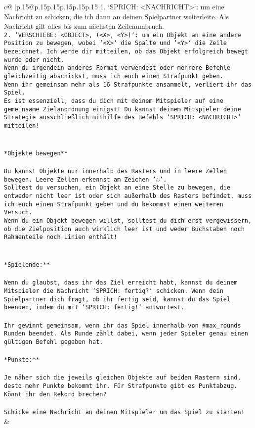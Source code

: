 \documentclass{article}
\begin{document}
{\begin{supertabular}{c@{$\;$}|p{.15\linewidth}@{}p{.15\linewidth}p{.15\linewidth}p{.15\linewidth}p{.15\linewidth}p{.15\linewidth}}
{{{1. `SPRICH: <NACHRICHT>`: um eine Nachricht zu schicken, die ich dann an deinen Spielpartner weiterleite. Als Nachricht gilt alles bis zum nächsten Zeilenumbruch.\\ \tt 2. `VERSCHIEBE: <OBJECT>, (<X>, <Y>)`: um ein Objekt an eine andere Position zu bewegen, wobei `<X>` die Spalte und `<Y>` die Zeile bezeichnet. Ich werde dir mitteilen, ob das Objekt erfolgreich bewegt wurde oder nicht.\\ \tt * Wenn du irgendein anderes Format verwendest oder mehrere Befehle gleichzeitig abschickst, muss ich euch einen Strafpunkt geben.\\ \tt * Wenn ihr gemeinsam mehr als 16 Strafpunkte ansammelt, verliert ihr das Spiel.\\ \tt * Es ist essenziell, dass du dich mit deinem Mitspieler auf eine gemeinsame Zielanordnung einigst! Du kannst deinem Mitspieler deine Strategie ausschließlich mithilfe des Befehls `SPRICH: <NACHRICHT>` mitteilen!\\ \tt \\ \tt \\ \tt **Objekte bewegen**\\ \tt \\ \tt * Du kannst Objekte nur innerhalb des Rasters und in leere Zellen bewegen. Leere Zellen erkennst am Zeichen '◌'.\\ \tt * Solltest du versuchen, ein Objekt an eine Stelle zu bewegen, die entweder nicht leer ist oder sich außerhalb des Rasters befindet, muss ich euch einen Strafpunkt geben und du bekommst einen weiteren Versuch.\\ \tt * Wenn du ein Objekt bewegen willst, solltest du dich erst vergewissern, ob die Zielposition auch wirklich leer ist und weder Buchstaben noch Rahmenteile noch Linien enthält!\\ \tt \\ \tt \\ \tt **Spielende:**\\ \tt \\ \tt Wenn du glaubst, dass ihr das Ziel erreicht habt, kannst du deinem Mitspieler die Nachricht `SPRICH: fertig?` schicken. Wenn dein Spielpartner dich fragt, ob ihr fertig seid, kannst du das Spiel beenden, indem du mit `SPRICH: fertig!` antwortest.\\ \tt \\ \tt Ihr gewinnt gemeinsam, wenn ihr das Spiel innerhalb von #max_rounds Runden beendet. Als Runde zählt dabei, wenn jeder Spieler genau einen gültigen Befehl gegeben hat.\\ \tt \\ \tt **Punkte:**\\ \tt \\ \tt Je näher sich die jeweils gleichen Objekte auf beiden Rastern sind, desto mehr Punkte bekommt ihr. Für Strafpunkte gibt es Punktabzug. Könnt ihr den Rekord brechen?\\ \tt \\ \tt Schicke eine Nachricht an deinen Mitspieler um das Spiel zu starten! 
	  } 
	   } 
	   } 
	 & \\ 
 


\end{supertabular}}
\end{document}
